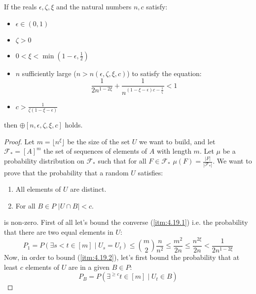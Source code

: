     \begin{lemma}[Lemma 4.19] \label{n_large_enough_valid_values}
        If the reals $\epsilon, \zeta, \xi$ and the natural numbers $n, c$ satisfy:
        \begin{itemize}
            \item $\epsilon \in (0,1)$
            \item $\zeta > 0$
            \item $0 < \xi < \min(1-\epsilon, \frac{1}{2})$
            \item $n$ sufficiently large ($n > n(\epsilon, \zeta, \xi, c)$) to satisfy the equation:
            \[
                \frac{1}{2n^{1-2\xi}} + \frac{1}{n^{(1 - \xi - \epsilon)c - \frac{1}{\zeta}}} < 1
            \]
            \item $c > \frac{1}{\zeta (1 - \xi - \epsilon)}$
        \end{itemize}
        then $\oplus[n, \epsilon, \zeta, \xi, c]$ holds.
        \begin{proof}
            Let $m = \lfloor n^\xi \rfloor$ be the size of the set $U$ we want to build, and let $\mathcal{F}_* = [A]^m$
            the set of sequences of elements of $A$ with length $m$.
            Let $\mu$ be a probability distribution on $\mathcal{F}_*$ such that for all $F \in \mathcal{F}_*$
            $\mu(F) = \frac{|F|}{|\mathcal{F}_*|}$.
            We want to prove that the probability that a random $U$ satisfies:
            \begin{enumerate}
                \item\label{itm:4.19.1} All elements of $U$ are distinct.
                \item\label{itm:4.19.2} For all $B \in P$ $|U \cap B| < c$.
            \end{enumerate}
            is non-zero.
            First of all let's bound the converse (\ref{itm:4.19.1}) i.e. the probability that there are two equal elements
            in $U$:
            \[
                P_1 = P(\exists s < t \in [m] \mid U_s = U_t)
                    \leq {m \choose 2} \frac{n}{n^2}
                    \leq \frac{m^2}{2n}
                    \leq \frac{n^{2\xi}}{2n}
                    < \frac{1}{2n^{1-2\xi}}
            \]
            Now, in order to bound (\ref{itm:4.19.2}), let's first bound the probability that at least $c$ elements of
            $U$ are in a given $B \in P$:
            \[
                P_B = P(\exists^{\geq c} t\in [m] \mid U_t \in B)
\]
\end{proof}
\end{lemma}
